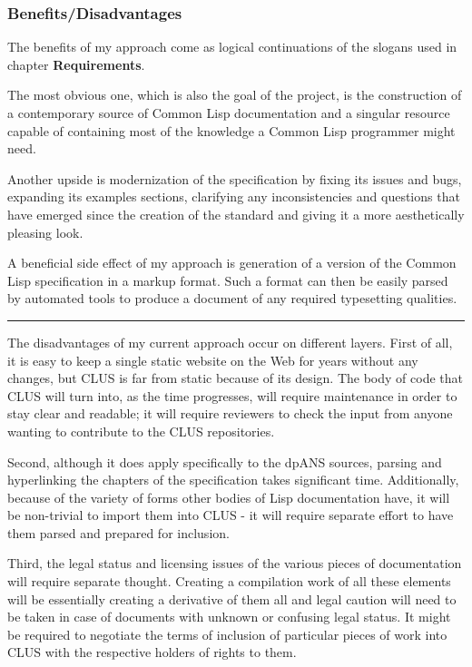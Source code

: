 \documentclass[11pt]{article}
\begin{document}
\subsubsection{Benefits/Disadvantages}
\label{sec:org444eff6}
The benefits of my approach come as logical continuations of the slogans used in chapter \textbf{Requirements}.

The most obvious one, which is also the goal of the project, is the construction of a contemporary source of Common Lisp documentation and a singular resource capable of containing most of the knowledge a Common Lisp programmer might need.

Another upside is modernization of the specification by fixing its issues and bugs, expanding its examples sections, clarifying any inconsistencies and questions that have emerged since the creation of the standard and giving it a more aesthetically pleasing look.

A beneficial side effect of my approach is generation of a version of the Common Lisp specification in a markup format. Such a format can then be easily parsed by automated tools to produce a document of any required typesetting qualities.

\rule{\linewidth}{0.5pt}

The disadvantages of my current approach occur on different layers.
First of all, it is easy to keep a single static website on the Web for years without any changes, but CLUS is far from static because of its design. The body of code that CLUS will turn into, as the time progresses, will require maintenance in order to stay clear and readable; it will require reviewers to check the input from anyone wanting to contribute to the CLUS repositories.

Second, although it does apply specifically to the dpANS sources, parsing and hyperlinking the chapters of the specification takes significant time. Additionally, because of the variety of forms other bodies of Lisp documentation have, it will be non-trivial to import them into CLUS - it will require separate effort to have them parsed and prepared for inclusion.

Third, the legal status and licensing issues of the various pieces of documentation will require separate thought. Creating a compilation work of all these elements will be essentially creating a derivative of them all and legal caution will need to be taken in case of documents with unknown or confusing legal status. It might be required to negotiate the terms of inclusion of particular pieces of work into CLUS with the respective holders of rights to them.
\end{document}
